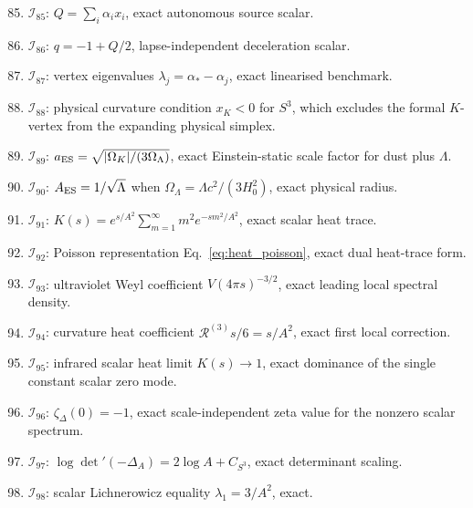 \documentclass[
  aps,
  prd,
  reprint,
  superscriptaddress,
  nofootinbib,
  floatfix,
  longbibliography
]{revtex4-2}
\newcommand{\Inv}{\mathcal I}
\begin{document}
\begin{enumerate}
\setcounter{enumi}{84}

\item \(\Inv_{85}\): \(Q=\sum_i\alpha_i x_i\), exact autonomous source scalar.

\item \(\Inv_{86}\): \(q=-1+Q/2\), lapse-independent deceleration scalar.

\item \(\Inv_{87}\): vertex eigenvalues \(\lambda_j=\alpha_*-\alpha_j\), exact
linearised benchmark.

\item \(\Inv_{88}\): physical curvature condition \(x_K<0\) for \(S^3\), which
excludes the formal \(K\)-vertex from the expanding physical simplex.

\item \(\Inv_{89}\): \(a_{\rm ES}=\sqrt{|\Omega_K|/(3\Omega_\Lambda)}\), exact
Einstein-static scale factor for dust plus \(\Lambda\).

\item \(\Inv_{90}\): \(A_{\rm ES}=1/\sqrt{\Lambda}\) when
\(\Omega_\Lambda=\Lambda c^2/(3H_0^2)\), exact physical radius.

\item \(\Inv_{91}\): \(K(s)=e^{s/A^2}\sum_{m=1}^\infty m^2e^{-sm^2/A^2}\), exact
scalar heat trace.

\item \(\Inv_{92}\): Poisson representation Eq.~\eqref{eq:heat_poisson}, exact
dual heat-trace form.

\item \(\Inv_{93}\): ultraviolet Weyl coefficient
\(V(4\pi s)^{-3/2}\), exact leading local spectral density.

\item \(\Inv_{94}\): curvature heat coefficient
\(\mathcal R^{(3)}s/6=s/A^2\), exact first local correction.

\item \(\Inv_{95}\): infrared scalar heat limit \(K(s)\to1\), exact dominance
of the single constant scalar zero mode.

\item \(\Inv_{96}\): \(\zeta_\Delta(0)=-1\), exact scale-independent zeta value
for the nonzero scalar spectrum.

\item \(\Inv_{97}\): \(\log\det'(-\Delta_A)=2\log A+C_{S^3}\), exact determinant
scaling.

\item \(\Inv_{98}\): scalar Lichnerowicz equality \(\lambda_1=3/A^2\), exact.


\end{enumerate}
\end{document}
